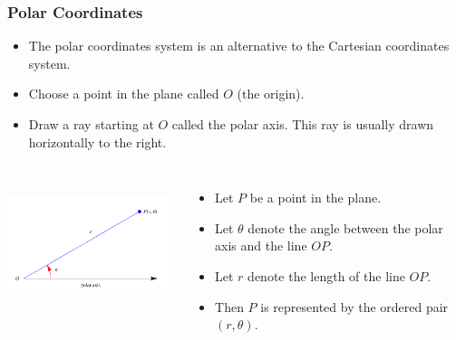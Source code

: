 \begin{frame}
\frametitle{Polar Coordinates}
\begin{itemize}
\item  The polar coordinates system is an alternative to the Cartesian coordinates system.
\item  Choose a point in the plane called $O$ (the origin).
\item  Draw a ray starting at $O$ called the polar axis.  This ray is usually drawn horizontally to the right.
\end{itemize}
\begin{columns}[c]
\includegraphics[height=4cm]{polar-curves/pictures/11-03-polar.pdf}%
\begin{itemize}
\item  Let $P$ be a point in the plane.
\item  Let $\theta$ denote the angle between the polar axis and the line $OP$.
\item  Let $r$ denote the length of the line $OP$.
\item  Then $P$ is represented by the ordered pair $(r, \theta )$.
\end{itemize}
\end{columns}
\end{frame}

